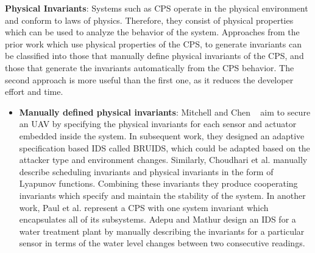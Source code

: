 \textbf{Physical Invariants}: Systems such as \ac{CPS} operate in the physical environment and conform to laws of physics. Therefore, they consist of physical properties which can be used to analyze the behavior of the system. Approaches from the prior work which use physical properties of the \ac{CPS}, to generate invariants can be classified into those that manually define physical invariants of the \ac{CPS}, and those that generate the invariants automatically from the \ac{CPS} behavior. The second approach is more useful than the first one, as it reduces the developer effort and time.

\begin{itemize}
\item \textbf{Manually defined physical invariants}: Mitchell and Chen ~\cite{mitchell2012specification} aim to secure an \ac{UAV} by specifying the physical invariants for each sensor and actuator embedded inside the system. In subsequent work, they designed an adaptive specification based \ac{IDS} \cite{mitchell2014adaptive} called BRUIDS, which could be adapted based on the attacker type and environment changes. Similarly, Choudhari et al. \cite{choudhari2013stability} manually describe scheduling invariants and physical invariants in the form of Lyapunov functions. Combining these invariants they produce cooperating invariants which specify and maintain the stability of the system. In another work, Paul et al. \cite{paul2014unified} represent a \ac{CPS} with one system invariant which encapsulates all of its subsystems. Adepu and Mathur \cite{adepu2016using} design an \ac{IDS} for a water treatment plant by manually describing the invariants for a particular sensor in terms of the water level changes between two consecutive readings.


\end{itemize}
